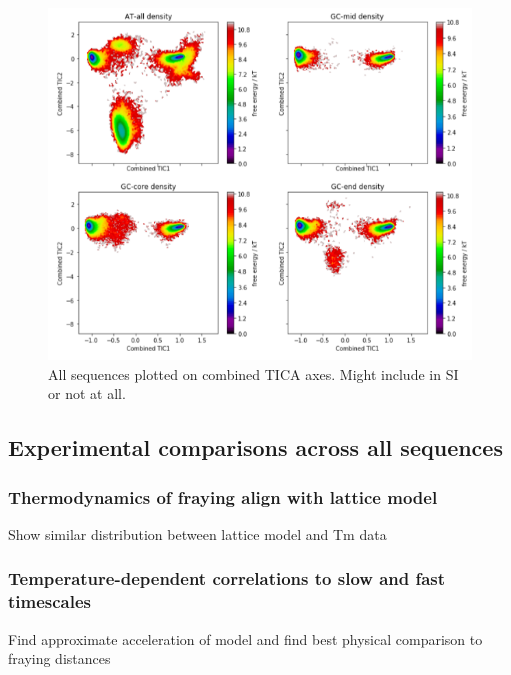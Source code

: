 \documentclass[journal=jpcbfk,manuscript=article]{achemso}
\begin{document}
\begin{figure}[ht!]
	\begin{center}
        \includegraphics[width=\textwidth]{Figs/figs_0804/all_seq_tica_cvs.PNG}
        \caption{All sequences plotted on combined TICA axes. Might include in SI or not at all.}
        \label{fig:all_seq_tica_cvs}
	\end{center}
\end{figure}


\subsection{\label{sec:Results}Experimental comparisons across all sequences}

\subsubsection{\label{sec:Results}Thermodynamics of fraying align with lattice model}
Show similar distribution between lattice model and Tm data\citep{Phys2019}

\subsubsection{\label{sec:Results}Temperature-dependent correlations to slow and fast timescales}
Find approximate acceleration of model and find best physical comparison to fraying distances
\end{document}
